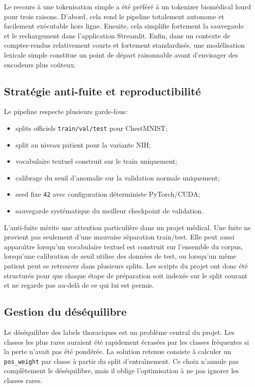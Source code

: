 \documentclass[11pt,a4paper]{article}
\begin{document}
Le recours \`a une tokenisation simple a \'et\'e pr\'ef\'er\'e \`a un tokenizer biom\'edical lourd pour trois raisons. D'abord, cela rend le pipeline totalement autonome et facilement ex\'ecutable hors ligne. Ensuite, cela simplifie fortement la sauvegarde et le rechargement dans l'application Streamlit. Enfin, dans un contexte de comptes-rendus relativement courts et fortement standardis\'es, une mod\'elisation lexicale simple constitue un point de d\'epart raisonnable avant d'envisager des encodeurs plus co\^uteux.

\subsection{Strat\'egie anti-fuite et reproductibilit\'e}
Le pipeline respecte plusieurs garde-fous:
\begin{itemize}
    \item splits officiels \texttt{train/val/test} pour ChestMNIST;
    \item split au niveau patient pour la variante NIH;
    \item vocabulaire textuel construit sur le train uniquement;
    \item calibrage du seuil d'anomalie sur la validation normale uniquement;
    \item seed fixe \texttt{42} avec configuration d\'eterministe PyTorch/CUDA;
    \item sauvegarde syst\'ematique du meilleur checkpoint de validation.
\end{itemize}

L'anti-fuite m\'erite une attention particuli\`ere dans un projet m\'edical. Une fuite ne provient pas seulement d'une mauvaise s\'eparation train/test. Elle peut aussi appara\^\i tre lorsqu'un vocabulaire textuel est construit sur l'ensemble du corpus, lorsqu'une calibration de seuil utilise des donn\'ees de test, ou lorsqu'un m\^eme patient peut se retrouver dans plusieurs splits. Les scripts du projet ont donc \'et\'e structur\'es pour que chaque \'etape de pr\'eparation soit index\'ee sur le split courant et ne regarde pas au-del\`a de ce qui lui est permis.

\subsection{Gestion du d\'es\'equilibre}
Le d\'es\'equilibre des labels thoraciques est un probl\`eme central du projet. Les classes les plus rares auraient \'et\'e rapidement \'ecras\'ees par les classes fr\'equentes si la perte n'avait pas \'et\'e pond\'er\'ee. La solution retenue consiste \`a calculer un \texttt{pos\_weight} par classe \`a partir du split d'entra\^\i nement. Ce choix n'annule pas compl\`etement le d\'es\'equilibre, mais il oblige l'optimisation \`a ne pas ignorer les classes rares.
\end{document}

